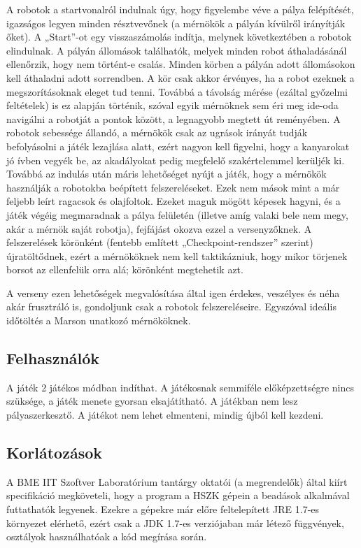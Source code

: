 A robotok a startvonalról indulnak úgy, hogy figyelembe véve a pálya felépítését, igazságos legyen minden résztvevőnek (a mérnökök a pályán kívülről irányítják őket). A „Start”-ot egy visszaszámolás indítja, melynek következtében a robotok elindulnak. A pályán állomások találhatók, melyek minden robot áthaladásánál ellenőrzik, hogy nem történt-e csalás. Minden körben a pályán adott állomásokon kell áthaladni adott sorrendben. A kör csak akkor érvényes, ha a robot ezeknek a megszorításoknak eleget tud tenni. Továbbá a távolság mérése (ezáltal győzelmi feltételek) is ez alapján történik, szóval egyik mérnöknek sem éri meg ide-oda navigálni a robotját a pontok között, a legnagyobb megtett út reményében.
A robotok sebessége állandó, a mérnökök csak az ugrások irányát tudják befolyásolni a játék lezajlása alatt, ezért nagyon kell figyelni, hogy a kanyarokat jó ívben vegyék be, az akadályokat pedig megfelelő szakértelemmel kerüljék ki. Továbbá az indulás után máris lehetőséget nyújt a játék, hogy a mérnökök használják a robotokba beépített felszereléseket. Ezek nem mások mint a már feljebb leírt ragacsok és olajfoltok. Ezeket maguk mögött képesek hagyni, és a játék végéig megmaradnak a pálya felületén (illetve amíg valaki bele nem megy, akár a mérnök saját robotja), fejfájást okozva ezzel a versenyzőknek. A felszerelések körönként (fentebb említett „Checkpoint-rendszer” szerint) újratöltődnek, ezért a mérnököknek nem kell taktikázniuk, hogy mikor törjenek borsot az ellenfelük orra alá; körönként megtehetik azt.

A verseny ezen lehetőségek megvalósítása által igen érdekes, veszélyes és néha akár frusztráló is, gondoljunk csak a robotok felszereléseire. Egyszóval ideális időtöltés a Marson unatkozó mérnököknek.

\subsection{Felhasználók}
A játék 2 játékos módban indíthat. A játékosnak semmiféle előképzettségre nincs szüksége, a játék menete gyorsan elsajátítható. A játékban nem lesz pályaszerkesztő. A játékot nem lehet elmenteni, mindig újból kell kezdeni.

\subsection{Korlátozások}
A BME IIT Szoftver Laboratórium tantárgy oktatói (a megrendelők) által kiírt specifikáció megköveteli, hogy a program a HSZK gépein a beadások alkalmával futtathatók legyenek. Ezekre a gépekre már előre feltelepített JRE 1.7-es környezet elérhető, ezért csak a JDK 1.7-es verziójaban már létező függvények, osztályok használhatóak a kód megírása során.


